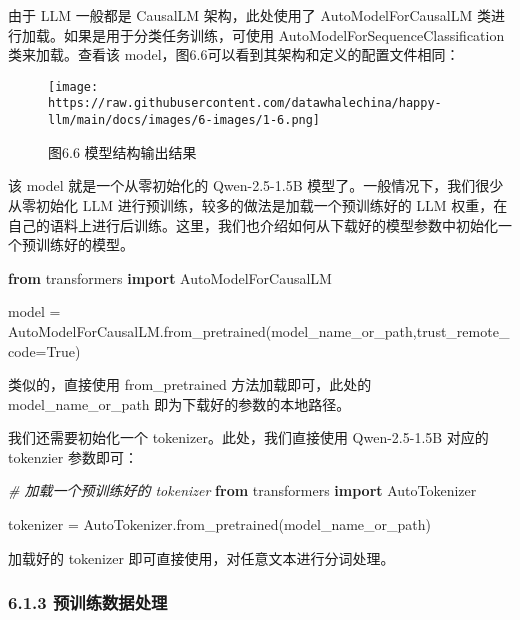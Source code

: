 \documentclass[
]{article}
\newenvironment{Shaded}{}{}
\newcommand{\CommentTok}[1]{\textcolor[rgb]{0.38,0.63,0.69}{\textit{#1}}}
\newcommand{\ImportTok}[1]{\textcolor[rgb]{0.00,0.50,0.00}{\textbf{#1}}}
\newcommand{\NormalTok}[1]{#1}
\newcommand{\OperatorTok}[1]{\textcolor[rgb]{0.40,0.40,0.40}{#1}}
\newcommand{\VariableTok}[1]{\textcolor[rgb]{0.10,0.09,0.49}{#1}}
\begin{document}
由于 LLM 一般都是 CausalLM 架构，此处使用了 AutoModelForCausalLM
类进行加载。如果是用于分类任务训练，可使用
AutoModelForSequenceClassification 类来加载。查看该
model，图6.6可以看到其架构和定义的配置文件相同：

\begin{figure}[htbp]\centering
\texttt{[image: https://raw.githubusercontent.com/datawhalechina/happy-llm/main/docs/images/6-images/1-6.png]}
\caption{图6.6 模型结构输出结果}
\end{figure}

该 model 就是一个从零初始化的 Qwen-2.5-1.5B
模型了。一般情况下，我们很少从零初始化 LLM
进行预训练，较多的做法是加载一个预训练好的 LLM
权重，在自己的语料上进行后训练。这里，我们也介绍如何从下载好的模型参数中初始化一个预训练好的模型。

\begin{Shaded}
\begin{Highlighting}[]
\ImportTok{from}\NormalTok{ transformers }\ImportTok{import}\NormalTok{ AutoModelForCausalLM}

\NormalTok{model }\OperatorTok{=}\NormalTok{ AutoModelForCausalLM.from\_pretrained(model\_name\_or\_path,trust\_remote\_code}\OperatorTok{=}\VariableTok{True}\NormalTok{)}
\end{Highlighting}
\end{Shaded}

类似的，直接使用 from\_pretrained 方法加载即可，此处的
model\_name\_or\_path 即为下载好的参数的本地路径。

我们还需要初始化一个 tokenizer。此处，我们直接使用 Qwen-2.5-1.5B 对应的
tokenzier 参数即可：

\begin{Shaded}
\begin{Highlighting}[]
\CommentTok{\# 加载一个预训练好的 tokenizer}
\ImportTok{from}\NormalTok{ transformers }\ImportTok{import}\NormalTok{ AutoTokenizer}

\NormalTok{tokenizer }\OperatorTok{=}\NormalTok{ AutoTokenizer.from\_pretrained(model\_name\_or\_path)}
\end{Highlighting}
\end{Shaded}

加载好的 tokenizer 即可直接使用，对任意文本进行分词处理。

\subsubsection{6.1.3
预训练数据处理}\label{ux9884ux8badux7ec3ux6570ux636eux5904ux7406}
\end{document}
